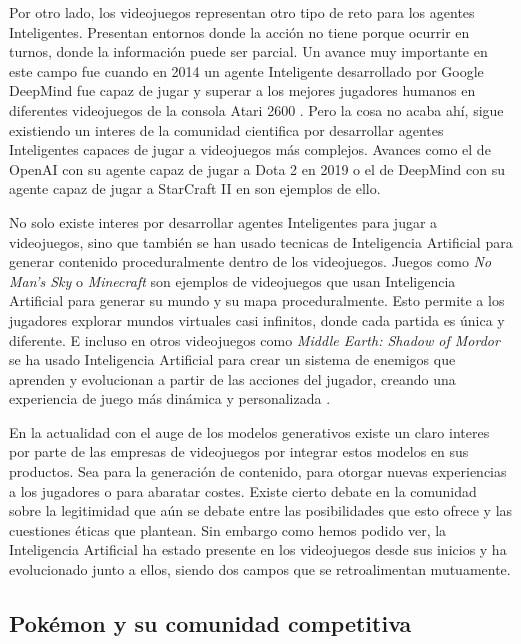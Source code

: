 Por otro lado, los videojuegos representan otro tipo de reto para los agentes Inteligentes. Presentan entornos donde la acción no tiene porque ocurrir en turnos, donde la información puede ser parcial. Un avance muy importante en este campo fue cuando en 2014 un agente Inteligente desarrollado por Google DeepMind fue capaz de jugar y superar a los mejores jugadores humanos en diferentes videojuegos de la consola Atari 2600 \cite{Atari2600}. Pero la cosa no acaba ahí, sigue existiendo un interes de la comunidad cientifica por desarrollar agentes Inteligentes capaces de jugar a videojuegos más complejos. Avances como el de OpenAI con su agente capaz de jugar a Dota 2 en 2019 \cite{OpenAIDota2} o el de DeepMind con su agente capaz de jugar a StarCraft II en  \cite{StarCraftII} son ejemplos de ello.

No solo existe interes por desarrollar agentes Inteligentes para jugar a videojuegos, sino que también se han usado tecnicas de Inteligencia Artificial para generar contenido proceduralmente dentro de los videojuegos. Juegos como \textit{No Man's Sky} o \textit{Minecraft} son ejemplos de videojuegos que usan Inteligencia Artificial para generar su mundo y su mapa proceduralmente. Esto permite a los jugadores explorar mundos virtuales casi infinitos, donde cada partida es única y diferente. E incluso en otros videojuegos como \textit{Middle Earth: Shadow of Mordor} se ha usado Inteligencia Artificial para crear un sistema de enemigos que aprenden y evolucionan a partir de las acciones del jugador, creando una experiencia de juego más dinámica y personalizada \cite{NemesisSystem}. 

En la actualidad con el auge de los modelos generativos existe un claro interes por parte de las empresas de videojuegos por integrar estos modelos en sus productos. Sea para la generación de contenido, para otorgar nuevas experiencias a los jugadores o para abaratar costes. Existe cierto debate en la comunidad sobre la legitimidad que aún se debate entre las posibilidades que esto ofrece y las cuestiones éticas que plantean. Sin embargo como hemos podido ver, la Inteligencia Artificial ha estado presente en los videojuegos desde sus inicios y ha evolucionado junto a ellos, siendo dos campos que se retroalimentan mutuamente.

\subsection{Pokémon y su comunidad competitiva}

